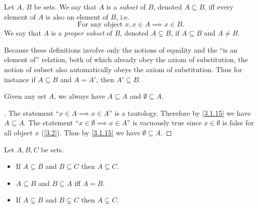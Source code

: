 \begin{defn}[Subsets]\label{3.1.15}
  Let \(A\), \(B\) be sets.
  We say that \(A\) is a \emph{subset} of \(B\), denoted \(A \subseteq B\), iff every element of \(A\) is also an element of \(B\), i.e.
  \[
    \text{For any object } x, x \in A \implies x \in B.
  \]
  We say that \(A\) is a \emph{proper subset} of \(B\), denoted \(A \subsetneq B\), if \(A \subseteq B\) and \(A \neq B\).
\end{defn}

\begin{rmk}\label{3.1.16}
  Because these definitions involve only the notions of equality and the ``is an element of'' relation, both of which already obey the axiom of substitution, the notion of subset also automatically obeys the axiom of substitution.
  Thus for instance if \(A \subseteq B\) and \(A = A'\), then \(A' \subseteq B\).
\end{rmk}

\begin{eg}\label{3.1.17}
  Given any set \(A\), we always have \(A \subseteq A\) and \(\emptyset \subseteq A\).
\end{eg}

\begin{proof}[]
  The statement ``\(x \in A \implies x \in A\)'' is a tautology.
  Therefore by \cref{3.1.15} we have \(A \subseteq A\).
  The statement ``\(x \in \emptyset \implies x \in A\)'' is vacuously true since \(x \in \emptyset\) is false for all object \(x\) (\cref{3.2}).
  Thus by \cref{3.1.15} we have \(\emptyset \subseteq A\).
\end{proof}

\begin{prop}\label{3.1.18}
  Let \(A, B, C\) be sets.
  \begin{itemize}
    \item If \(A \subseteq B\) and \(B \subseteq C\) then \(A \subseteq C\).
    \item \(A \subseteq B\) and \(B \subseteq A\) iff \(A = B\).
    \item If \(A \subsetneq B\) and \(B \subsetneq C\) then \(A \subsetneq C\).
  \end{itemize}
\end{prop}

